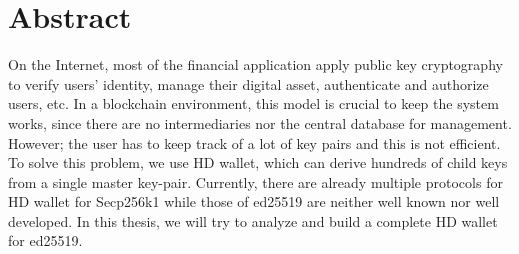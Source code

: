 \chapter*{Abstract}
\thispagestyle{fancy}
\label{preface}
\hspace*{5cm}

On the Internet, most of the financial application apply public key cryptography to verify users' identity, manage their digital asset, authenticate and authorize users, etc. In a blockchain environment, this model is crucial to keep the system works, since there are no intermediaries nor the central database for management. However; the user has to keep track of a lot of key pairs and this is not efficient.
To solve this problem, we use HD wallet, which can derive hundreds of child keys from a single master key-pair. Currently, there are already multiple protocols for HD wallet for Secp256k1 while those of ed25519 are neither well known nor well developed. In this thesis, we will try to analyze and build a complete HD wallet for ed25519.

\cleardoublepage
